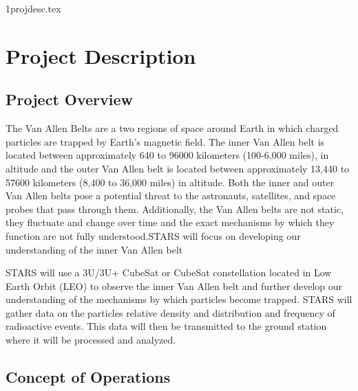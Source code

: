 \documentclass{ece}
\begin{document}
{1projdesc.tex}

\section{Project Description}
\subsection{Project Overview}

The Van Allen Belts are a two regions of space around Earth in which charged particles are trapped by Earth's magnetic field. The inner Van Allen belt is located between approximately 640 to 96000 kilometers (100-6,000 miles), in altitude and the outer Van Allen belt is located between approximately 13,440 to 57600 kilometers (8,400 to 36,000 miles) in altitude. \cite{VanAllen_1} Both the inner and outer Van Allen belts pose a potential threat to the astronauts, satellites, and space probes that pass through them. Additionally, the Van Allen belts are not static, they fluctuate and change over time and the exact mechanisms by which they function are not fully understood.STARS will focus on developing our understanding of the inner Van Allen belt

STARS will use a 3U/3U+ CubeSat or CubeSat constellation located in Low Earth Orbit (LEO) to observe the inner Van Allen belt and further develop our understanding of the mechanisms by which particles become trapped. STARS will gather data on the particles relative density and distribution and frequency of radioactive events. This data will then be transmitted to the ground station where it will be processed and analyzed.

\subsection{Concept of Operations}
\end{document}
